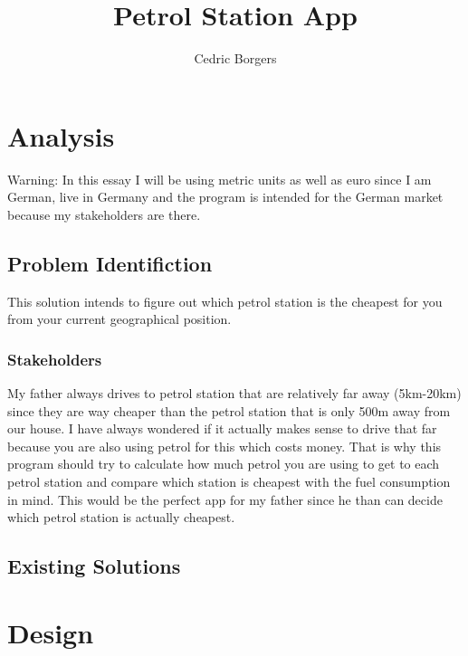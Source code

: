 \documentclass{article}
\title{Petrol Station App}
\author{Cedric Borgers}
\begin{document}
\maketitle
\tableofcontents
\section{Analysis}
Warning: In this essay I will be using metric units as well as euro since I am German, live in Germany and the program is intended for the German market because my stakeholders are there.

\subsection{Problem Identifiction}
This solution intends to figure out which petrol station is the cheapest for you from your current geographical position.
\subsubsection{Stakeholders}
My father always drives to petrol station that are relatively far away (5km-20km) since they are way cheaper than the petrol station that is only 500m away from our house.
I have always wondered if it actually makes sense to drive that far because you are also using petrol for this which costs money. That is why this program should try to calculate how much petrol you are using to get to each petrol station and compare which station is cheapest with the fuel consumption in mind. This would be the perfect app for my father since he than can decide which petrol station is actually cheapest.

\subsection{Existing Solutions}
\section{Design}
\end{document}
